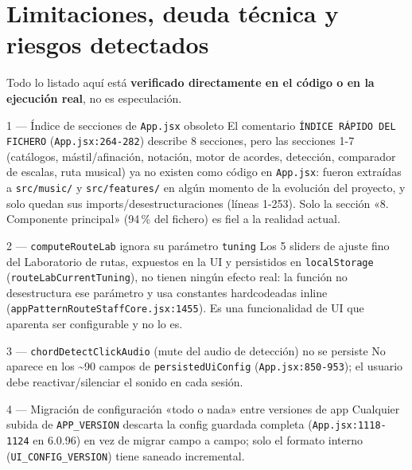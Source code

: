 \documentclass[a4paper,11pt,oneside]{report}
\begin{document}
\endgroup

\chapter{Limitaciones, deuda técnica y riesgos detectados}
\label{sec:17}

Todo lo listado aquí está \textbf{verificado directamente en el código o en la ejecución real}, no es especulación.

\begin{hallazgobox}{1 --- Índice de secciones de \texttt{App.jsx} obsoleto}
El comentario \lstinline!ÍNDICE RÁPIDO DEL FICHERO! (\lstinline!App.jsx:264-282!) describe 8 secciones, pero las secciones 1-7 (catálogos, mástil/afinación, notación, motor de acordes, detección, comparador de escalas, ruta musical) ya no existen como código en \lstinline!App.jsx!: fueron extraídas a \lstinline!src/music/! y \lstinline!src/features/! en algún momento de la evolución del proyecto, y solo quedan sus imports/desestructuraciones (líneas 1-253). Solo la sección «8. Componente principal» (94\,\% del fichero) es fiel a la realidad actual.
\end{hallazgobox}

\begin{hallazgobox}{2 --- \texttt{computeRouteLab} ignora su parámetro \texttt{tuning}}
Los 5 sliders de ajuste fino del Laboratorio de rutas, expuestos en la UI y persistidos en \lstinline!localStorage! (\lstinline!routeLabCurrentTuning!), no tienen ningún efecto real: la función no desestructura ese parámetro y usa constantes hardcodeadas inline (\lstinline!appPatternRouteStaffCore.jsx:1455!). Es una funcionalidad de UI que aparenta ser configurable y no lo es.
\end{hallazgobox}

\begin{hallazgobox}{3 --- \texttt{chordDetectClickAudio} (mute del audio de detección) no se persiste}
No aparece en los \textasciitilde90 campos de \lstinline!persistedUiConfig! (\lstinline!App.jsx:850-953!); el usuario debe reactivar/silenciar el sonido en cada sesión.
\end{hallazgobox}

\begin{hallazgobox}{4 --- Migración de configuración «todo o nada» entre versiones de app}
Cualquier subida de \lstinline!APP_VERSION! descarta la config guardada completa (\lstinline!App.jsx:1118-1124! en 6.0.96) en vez de migrar campo a campo; solo el formato interno (\lstinline!UI_CONFIG_VERSION!) tiene saneado incremental.
\end{hallazgobox}
\end{document}

